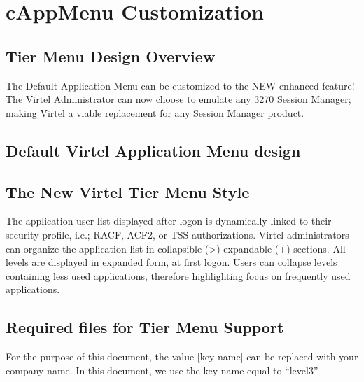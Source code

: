 \documentclass[letterpaper,10pt,english]{sphinxmanual}
\begin{document}
\ignorespaces 

\chapter{cAppMenu Customization}
\label{\detokenize{Customization:cappmenu-customization}}\label{\detokenize{Customization:index-124}}

\section{Tier Menu Design Overview}
\label{\detokenize{Customization:tier-menu-design-overview}}
\sphinxAtStartPar
The Default Application Menu can be customized to the NEW enhanced feature!  The Virtel Administrator can now choose to emulate any 3270 Session Manager; making Virtel a viable replacement for any Session Manager product.


\section{Default Virtel Application Menu design}
\label{\detokenize{Customization:default-virtel-application-menu-design}}
\sphinxAtStartPar
{}

\sphinxAtStartPar
{}


\section{The New Virtel Tier Menu Style}
\label{\detokenize{Customization:the-new-virtel-tier-menu-style}}
\sphinxAtStartPar
The application user list displayed after logon is dynamically linked to their security profile, i.e.; RACF, ACF2, or TSS authorizations. Virtel administrators can organize the application list in collapsible (\textgreater{}) expandable (+) sections. All levels are displayed in expanded form, at first logon. Users can collapse levels containing less used applications, therefore highlighting focus on frequently used applications.

\sphinxAtStartPar
{}

\sphinxAtStartPar
{}


\section{Required files for Tier Menu Support}
\label{\detokenize{Customization:required-files-for-tier-menu-support}}
\sphinxAtStartPar
For the purpose of this document, the value {[}key name{]} can be replaced with your company name. In this document, we use the key name equal to “level3”.
\end{document}
